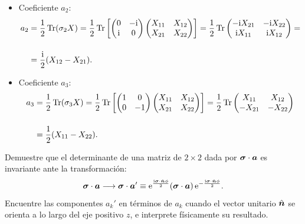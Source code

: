 \begin{resolucion}
\begin{enumerate}
\begin{itemize}
    \item Coeficiente $a_2$:
    \begin{align*}
    a_2 & = \frac{1}{2} \operatorname{Tr}(\sigma_2 X) = \frac{1}{2} \operatorname{Tr} \left[ \begin{pmatrix} 0 & -\mathrm{i} \\ \mathrm{i} & 0 \end{pmatrix} \begin{pmatrix} X_{11} & X_{12} \\ X_{21} & X_{22} \end{pmatrix} \right] = \frac{1}{2} \operatorname{Tr} \begin{pmatrix} -\mathrm{i} X_{21} & -\mathrm{i} X_{22} \\ \mathrm{i} X_{11} & \mathrm{i} X_{12} \end{pmatrix} =\\[12pt]
    & = \frac{\mathrm{i}}{2} (X_{12} - X_{21}).
    \end{align*}

    \item Coeficiente $a_3$:
    \begin{align*}
    a_3 & = \frac{1}{2} \operatorname{Tr}(\sigma_3 X) = \frac{1}{2} \operatorname{Tr} \left[ \begin{pmatrix} 1 & 0 \\ 0 & -1 \end{pmatrix} \begin{pmatrix} X_{11} & X_{12} \\ X_{21} & X_{22} \end{pmatrix} \right] = \frac{1}{2} \operatorname{Tr} \begin{pmatrix} X_{11} & X_{12} \\ -X_{21} & -X_{22} \end{pmatrix} \\[12pt]
    & = \frac{1}{2} (X_{11} - X_{22}).
    \end{align*}
  \end{itemize}
\end{enumerate}
\end{resolucion}
\begin{enunciado}
Demuestre que el determinante de una matriz de $2 \times 2$ dada por $\bm{\sigma} \cdot \bm{a}$ es invariante ante la transformación:
\[
\bm{\sigma} \cdot \bm{a} \longrightarrow \bm{\sigma} \cdot \bm{a}' \equiv \mathrm{e}^{\frac{\mathrm{i} \bm{\sigma} \cdot \hat{\bm{n}} \phi}{2}} (\bm{\sigma} \cdot \bm{a}) \, \mathrm{e}^{-\frac{\mathrm{i} \bm{\sigma} \cdot \hat{\bm{n}} \phi}{2}}.
\]
Encuentre las componentes $a_k'$ en términos de $a_k$ cuando el vector unitario $\hat{\bm{n}}$ se orienta a lo largo del eje positivo $z$, e interprete físicamente su resultado.
\end{enunciado}

